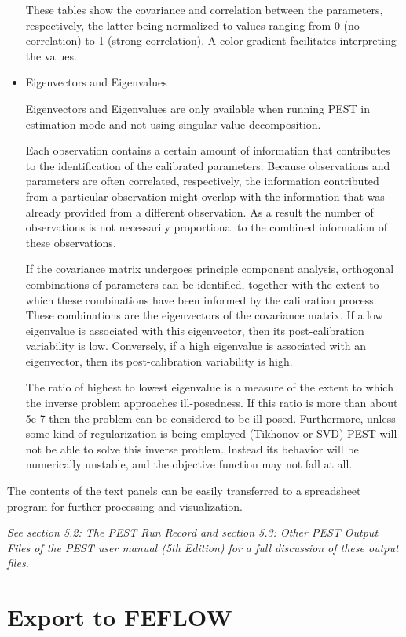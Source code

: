 \begin{itemize}
These tables show the covariance and correlation between the parameters, respectively, the latter being normalized to values ranging from 0 (no correlation) to 1 (strong correlation). A color gradient facilitates interpreting the values.

\item	Eigenvectors and Eigenvalues 

Eigenvectors and Eigenvalues are only available when running PEST in estimation mode and not using singular value decomposition.

Each observation contains a certain amount of information that contributes to the identification of the calibrated parameters. Because observations and parameters are often correlated, respectively, the information contributed from a particular observation might overlap with the information that was already provided from a different observation. As a result the number of observations is not necessarily proportional to the combined information of these observations. 

If the covariance matrix undergoes principle component analysis, orthogonal combinations of parameters can be identified, together with the extent to which these combinations have been informed by the calibration process. These combinations are the eigenvectors of the covariance matrix. If a low eigenvalue is associated with this eigenvector, then its post-calibration variability is low. Conversely, if a high eigenvalue is associated with an eigenvector, then its post-calibration variability is high. 

The ratio of highest to lowest eigenvalue is a measure of the extent to which the inverse problem approaches ill-posedness. If this ratio is more than about 5e-7 then the problem can be considered to be ill-posed. Furthermore, unless some kind of regularization is being employed (Tikhonov or SVD) PEST will not be able to solve this inverse problem. Instead its behavior will be numerically unstable, and the objective function may not fall at all.

\end{itemize}

The contents of the text panels can be easily transferred to a spreadsheet program for further processing and visualization.

\textit{See section 5.2: The PEST Run Record and section 5.3: Other PEST Output Files of the PEST user manual (5th Edition) for a full discussion of these output files.}

\section{Export to FEFLOW}

